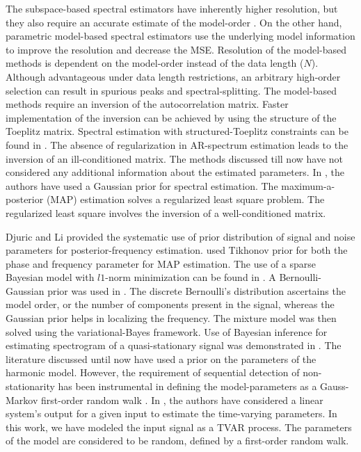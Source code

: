 The subspace-based spectral estimators have inherently higher resolution, but they also require an accurate estimate of the model-order \cite{morency2018joint}. On the other hand, parametric model-based spectral estimators use the underlying model information to improve the resolution and decrease the MSE. Resolution of the model-based methods is dependent on the model-order instead of the data length ($N$). Although advantageous under data length restrictions, an arbitrary high-order selection can result in spurious peaks and spectral-splitting. The model-based methods require an inversion of the autocorrelation matrix. Faster implementation of the inversion can be achieved by using the structure of the Toeplitz matrix. Spectral estimation with structured-Toeplitz constraints can be found in \cite{hansen2018superfast}. The absence of regularization in AR-spectrum estimation leads to the inversion of an ill-conditioned matrix. The methods discussed till now have not considered any additional information about the estimated parameters. In \cite{kitagawa1985smoothness}, the authors have used a Gaussian prior for spectral estimation. The maximum-a-posterior (MAP) estimation solves a regularized least square problem. The regularized least square involves the inversion of a well-conditioned matrix. 

Djuric and Li \cite{djuric1995bayesian} provided the systematic use of prior distribution of signal and noise parameters for posterior-frequency estimation. \cite{fu2007map} used Tikhonov prior for both the phase and frequency parameter for MAP estimation. The use of a sparse Bayesian model with $l1$-norm minimization can be found in \cite{zhao2015robust}. A Bernoulli-Gaussian prior was used in \cite{badiu2017variational}. The discrete Bernoulli's distribution ascertains the model order, or the number of components present in the signal, whereas the Gaussian prior helps in localizing the frequency. The mixture model was then solved using the variational-Bayes framework.  Use of Bayesian inference for estimating spectrogram of a quasi-stationary signal was demonstrated in \cite{das2018dynamic}. The literature discussed until now have used a prior on the parameters of the harmonic model. However, the requirement of sequential detection of non-stationarity has been instrumental in defining the model-parameters as a Gauss-Markov first-order random walk \cite{chu2017new}. In \cite{chu2017new}, the authors have considered a linear system's output for a given input to estimate the time-varying parameters. In this work, we have modeled the input signal as a TVAR process. The parameters of the model are considered to be random, defined by a first-order random walk. 


